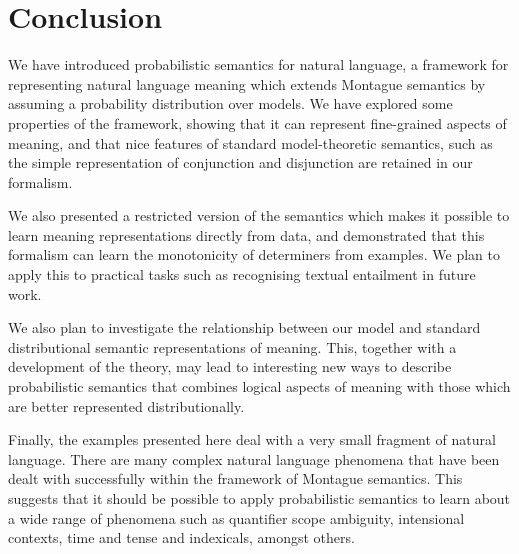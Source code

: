 \documentclass{svmult}
\begin{document}
\section{Conclusion}

We have introduced probabilistic semantics for natural language, a
framework for representing natural language meaning which extends
Montague semantics by assuming a probability distribution over
models. We have explored some properties of the framework, showing
that it can represent fine-grained aspects of meaning, and that nice
features of standard model-theoretic semantics, such as the simple
representation of conjunction and disjunction are retained in our
formalism.

We also presented a restricted version of the semantics which makes it
possible to learn meaning representations directly from data, and
demonstrated that this formalism can learn the monotonicity of
determiners from examples. We plan to apply this to practical tasks
such as recognising textual entailment in future work.

We also plan to investigate the relationship between our model and
standard distributional semantic representations of meaning. This,
together with a development of the theory, may lead to interesting
new ways to describe probabilistic semantics that combines logical
aspects of meaning with those which are better represented
distributionally.

Finally, the examples presented here deal with a very small fragment
of natural language. There are many complex natural language phenomena
that have been dealt with successfully within the framework of
Montague semantics. This suggests that it should be possible to apply
probabilistic semantics to learn about a wide range of phenomena such
as quantifier scope ambiguity, intensional contexts, time and tense
and indexicals, amongst others.





\end{document}
